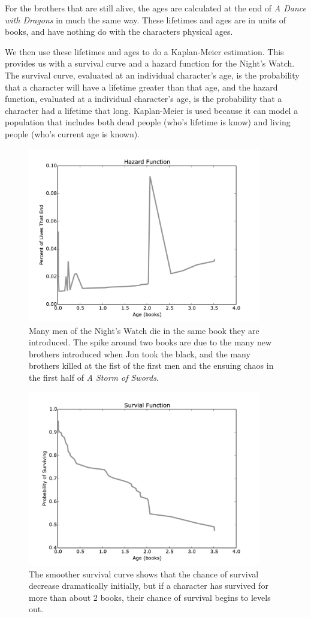 \documentclass{article}
\begin{document}
For the brothers that are still alive, the ages are calculated at the end of \textit{A Dance with Dragons} in much the same way.  These lifetimes and ages are in units of books, and have nothing do with the characters physical ages.

We then use these lifetimes and ages to do a Kaplan-Meier estimation. This provides us with a survival curve and a hazard function for the Night's Watch. The survival curve, evaluated at an individual character's age, is the probability that a character will have a lifetime greater than that age, and the hazard function, evaluated at a individual character's age, is the probability that a character had a lifetime that long. Kaplan-Meier is used because it can model a population that includes both dead people (who's lifetime is know) and living people (who's current age is known).


\begin{figure}[ht!]
\centering
\includegraphics[width=4in]{NWHaz.png}
\caption{Many men of the Night's Watch die in the same book they are introduced.  The spike around two books are due to the many new brothers introduced when Jon took the black, and the many brothers killed at the fist of the first men and the ensuing chaos in the first half of \textit{A Storm of Swords}.}
\label{fig:nwhaz}
\end{figure}



\begin{figure}[ht!]
\centering
\includegraphics[width=4in]{NWSurv.png}
\caption{The smoother survival curve shows that the chance of survival decrease dramatically initially, but if a character has survived for more than about 2 books, their chance of survival begins to levels out.}
\label{fig:nwsurv}
\end{figure}
\end{document}
